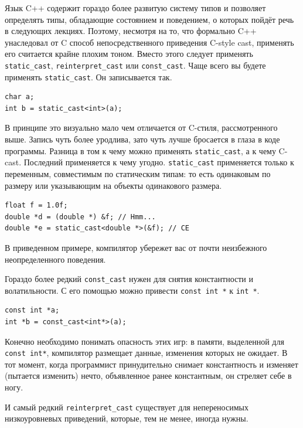 \documentclass[a4paper,12pt,oneside]{book}
\begin{document}
Язык C++ содержит гораздо более развитую систему типов и позволяет определять типы, обладающие состоянием и поведением, о которых пойдёт речь в следующих лекциях. Поэтому, несмотря на то, что формально C++ унаследовал от C способ непосредственного приведения C-style cast, применять его считается крайне плохим тоном. Вместо этого следует применять \lstinline!static_cast!, \lstinline!reinterpret_cast! или \lstinline!const_cast!. Чаще всего вы будете применять \lstinline!static_cast!. Он записывается так.

\begin{lstlisting}
char a;
int b = static_cast<int>(a);
\end{lstlisting}

В принципе это визуально мало чем отличается от C-стиля, рассмотренного выше. Запись чуть более уродлива, зато чуть лучше бросается в глаза в коде программы. Разница в том к чему можно применять \lstinline!static_cast!, а к чему C-cast. Последний применяется к чему угодно. \lstinline!static_cast! применяется только к переменным, совместимым по статическим типам: то есть одинаковым по размеру или указывающим на объекты одинакового размера.

\begin{lstlisting}
float f = 1.0f;
double *d = (double *) &f; // Hmm...
double *e = static_cast<double *>(&f); // CE
\end{lstlisting}

В приведенном примере, компилятор убережет вас от почти неизбежного неопределенного поведения.

Гораздо более редкий \lstinline!const_cast! нужен для снятия константности и волатильности. С его помощью можно привести \lstinline!const int *! к \lstinline!int *!. 

\begin{lstlisting}
const int *a;
int *b = const_cast<int*>(a);
\end{lstlisting}

Конечно необходимо понимать опасность этих игр: в памяти, выделенной для \lstinline!const int*!, компилятор размещает данные, изменения которых не ожидает. В тот момент, когда программист принудительно снимает константность и изменяет (пытается изменить) нечто, объявленное ранее константным, он стреляет себе в ногу.

И самый редкий \lstinline!reinterpret_cast! существует для непереносимых низкоуровневых приведений, которые, тем не менее, иногда нужны.
\end{document}
